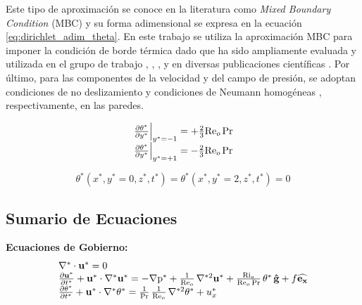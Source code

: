 Este tipo de aproximación se conoce en la literatura como \textit{Mixed Boundary \linebreak Condition} (MBC) \cite{straub2019influence} y su forma adimensional se expresa en la ecuación \ref{eq:dirichlet_adim_theta}. En este trabajo se utiliza la aproximación MBC para imponer la condición de borde térmica dado que ha sido ampliamente evaluada y utilizada en el grupo de trabajo \cite{abregu2023dns}, \cite{szuban2023}, \cite{machaca2024}, y en diversas publicaciones científicas \cite{kawamura2000dns, kasagi1992direct}. Por último, para las componentes de la velocidad y del campo de presión, se adoptan condiciones de no deslizamiento y condiciones de Neumann homogéneas \cite{bartholomew2020xcompact3d}, respectivamente, en las paredes. 

\begin{align}
\begin{array}{l}
    \left. \frac{\partial \theta^*}{\partial y^*} \right\vert_{y^*=-1} = + \frac{2}{3} \text{Re}_o \hspace{0.5mm} \text{Pr} \\
    \left. \frac{\partial \theta^*}{\partial y^*} \right\vert_{y^*=+1} = - \frac{2}{3} \text{Re}_o \hspace{0.5mm} \text{Pr} 
\end{array}
\label{eq:neumann_adim}
\end{align}

\begin{equation}
\theta^*(x^*,y^*=0,z^*,t^*) = \theta^*(x^*,y^*=2,z^*,t^*) = 0
\label{eq:dirichlet_adim_theta}
\end{equation}



\subsection{Sumario de Ecuaciones}

\textbf{Ecuaciones de Gobierno:}
\begin{equation}
\begin{array}{l}
    \nabla^* \cdot \mathbf{u^*} = 0 \\
    \frac{\partial \mathbf{u^*}}{\partial t^*} + \mathbf{u^*} \cdot \nabla^* \mathbf{u^*} = 
    -\nabla \text{p}^* + \frac{1}{\text{Re}_o} \hspace{0.5mm} \nabla^{*2} \mathbf{u^*} + \frac{\text{Ri}_o}{\text{Re}_o \hspace{0.5mm} \text{Pr}} \hspace{0.5mm} \theta^* \hspace{0.5mm} \mathbf{\hat{g}} + f \mathbf{\widehat{e_x}}  \\
    \frac{\partial \theta^*}{\partial t^*} + \mathbf{u^*} \cdot \nabla^* \theta^* = 
    \frac{1}{\text{Pr}}\hspace{0.5mm}  \frac{1}{\text{Re}_o} \hspace{0.5mm} \nabla^{*2} \theta^* + u_x^* 
\end{array}
\label{eq:gob_system_res1}
\end{equation}

